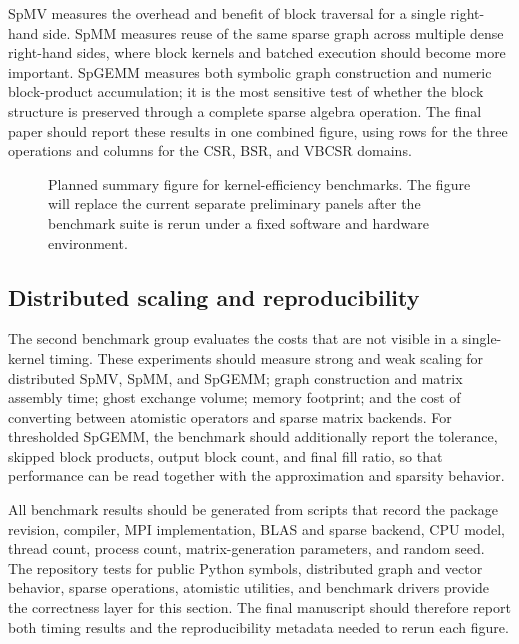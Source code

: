 \documentclass[
reprint,
superscriptaddress,
frontmatterverbose,
amsmath,amssymb,
pra,
]{revtex4-2}
\begin{document}
SpMV measures the overhead and benefit of block traversal for a single
right-hand side.  SpMM measures reuse of the same sparse graph across multiple
dense right-hand sides, where block kernels and batched execution should become
more important.  SpGEMM measures both symbolic graph construction and numeric
block-product accumulation; it is the most sensitive test of whether the block
structure is preserved through a complete sparse algebra operation.  The final
paper should report these results in one combined figure, using rows for the
three operations and columns for the CSR, BSR, and VBCSR domains.

\begin{figure}[t]
    \centering
    \caption{Planned summary figure for kernel-efficiency benchmarks.  The
    figure will replace the current separate preliminary panels after the
    benchmark suite is rerun under a fixed software and hardware environment.}
    \label{fig:benchmark_efficiency}
\end{figure}

\subsection{Distributed scaling and reproducibility}

The second benchmark group evaluates the costs that are not visible in a
single-kernel timing.  These experiments should measure strong and weak scaling
for distributed SpMV, SpMM, and SpGEMM; graph construction and matrix assembly
time; ghost exchange volume; memory footprint; and the cost of converting
between atomistic operators and sparse matrix backends.  For thresholded
SpGEMM, the benchmark should additionally report the tolerance, skipped block
products, output block count, and final fill ratio, so that performance can be
read together with the approximation and sparsity behavior.

All benchmark results should be generated from scripts that record the package
revision, compiler, MPI implementation, BLAS and sparse backend, CPU model,
thread count, process count, matrix-generation parameters, and random seed.
The repository tests for public Python symbols, distributed graph and vector
behavior, sparse operations, atomistic utilities, and benchmark drivers provide
the correctness layer for this section.  The final manuscript should therefore
report both timing results and the reproducibility metadata needed to rerun each
figure.
\end{document}
